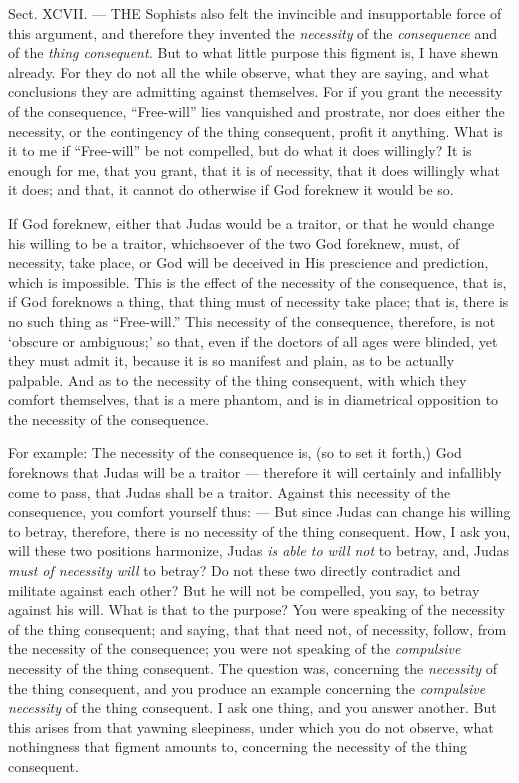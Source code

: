 
Sect. XCVII. — THE Sophists also felt the invincible and insupportable force of this argument, and therefore they invented the \emph{necessity }of the \emph{consequence }and of the \emph{thing consequent. }But to what little purpose this figment is, I have shewn already. For they do not all the while observe, what they are saying, and what conclusions they are admitting against themselves. For if you grant the necessity of the consequence, “Free-will” lies vanquished and prostrate, nor does either the necessity, or the contingency of the thing consequent, profit it anything. What is it to me if “Free-will” be not compelled, but do what it does willingly? It is enough for me, that you grant, that it is of necessity, that it does willingly what it does; and that, it cannot do otherwise if God foreknew it would be so.

If God foreknew, either that Judas would be a traitor, or that he would change his willing to be a traitor, whichsoever of the two God foreknew, must, of necessity, take place, or God will be deceived in His prescience and prediction, which is impossible. This is the effect of the necessity of the consequence, that is, if God foreknows a thing, that thing must of necessity take place; that is, there is no such thing as “Free-will.” This necessity of the consequence, therefore, is not ‘obscure or ambiguous;’ so that, even if the doctors of all ages were blinded, yet they must admit it, because it is so manifest and plain, as to be actually palpable. And as to the necessity of the thing consequent, with which they comfort themselves, that is a mere phantom, and is in diametrical opposition to the necessity of the consequence.

For example: The necessity of the consequence is, (so to set it forth,) God foreknows that Judas will be a traitor — therefore it will certainly and infallibly come to pass, that Judas shall be a traitor. Against this necessity of the consequence, you comfort yourself thus: — But since Judas can change his willing to betray, therefore, there is no necessity of the thing consequent. How, I ask you, will these two positions harmonize, Judas \emph{is able to will not }to betray, and, Judas \emph{must of necessity will }to betray? Do not these two directly contradict and militate against each other? But he will not be compelled, you say, to betray against his will. What is that to the purpose? You were speaking of the necessity of the thing consequent; and saying, that that need not, of necessity, follow, from the necessity of the consequence; you were not speaking of the \emph{compulsive }necessity of the thing consequent. The question was, concerning the \emph{necessity }of the thing consequent, and you produce an example concerning the \emph{compulsive necessity }of the thing consequent. I ask one thing, and you answer another. But this arises from that yawning sleepiness, under which you do not observe, what nothingness that figment amounts to, concerning the necessity of the thing consequent.

